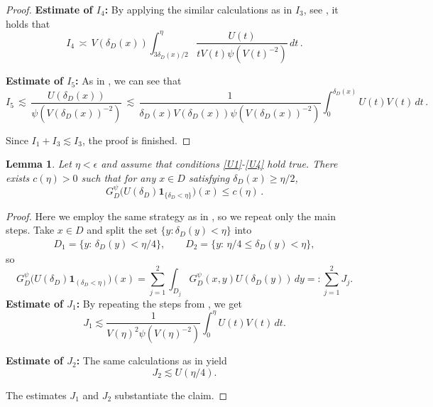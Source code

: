 \documentclass[12pt,a4paper,onecolumn]{article}
\newtheorem{lem}[thm]{Lemma}
\theoremstyle{definition}
\newcommand{\1}{\mathbf 1}
\newcommand{\de}{\delta_D}
\newcommand{\GDP}{G_D^\psi}
\numberwithin{equation}{section}
\begin{document}
\begin{proof}
        \noindent
        {\bf Estimate of $I_4$:} By applying the similar calculations as in $I_3$, see \cite[Estimate of $I_4$ in Lemma A.3]{Bio23cpaa}, it holds that
        \begin{equation*}
        	I_4\,\asymp\, V(\de(x))\int_{3\de(x)/2}^{\eta} \frac{U(t)}{tV(t)\psi(V(t)^{-2})}\, dt\,.
        \end{equation*}
        
        	\noindent
        {\bf Estimate of $I_5$:}  As in \cite[Estimate of $I_5$ in Lemma A.3]{Bio23cpaa}, we can see that
        \begin{equation*}
        	I_5 \,\lesssim\, \frac{U(\de(x))}{\psi(V(\de(x))^{-2})}\,\lesssim\, \frac{1}{\de(x)V(\de(x))\psi(V(\de(x))^{-2})}\int_0^{\de(x)}U(t)V(t)\, dt\, .
        \end{equation*}
        
        Since $I_1 + I_3\lesssim I_3$, the proof is finished.

    \end{proof}
    		

        \begin{lem}\label{apx:l:away-from-bdry}
		Let $\eta<\epsilon$ and assume that  conditions \ref{U1}-\ref{U4} hold true. There exists $c(\eta)>0$ such that for any $x\in D$ satisfying $\de(x)\ge\eta/2$, 
		\begin{equation*}
			\GDP\big(U(\de)\1_{\{\de<\eta\}}\big)(x)\le c(\eta)\, .
		\end{equation*}
	\end{lem}

    \begin{proof}
        Here we employ the same strategy as in \cite[Lemma A.4]{Bio23cpaa}, so we repeat only the main steps. Take $x\in D$ and split the set $\{y:\de(y)< \eta\}$ into 
        \begin{align*}
        	D_1=\{y:\, \de(y)<\eta/4\},\qquad
        	D_2=\{y:\, \eta/4 \le \de(y) <\eta\},
        \end{align*}
        so
        $$
        \GDP\big(U(\delta_D)\1_{(\delta_D<\eta)}\big)(x)=\sum_{j=1}^2 \int_{D_j}\GDP(x,y)U(\delta_D(y))\, dy =:\sum_{j=1}^2 J_j.
        $$
        {\bf Estimate of $J_1$:} 
        By repeating the steps from  \cite[Estimate of $J_1$ in Lemma A.4]{Bio23cpaa}, we get
        \begin{equation*}
        	J_1\lesssim\frac{1}{V(\eta)^2\psi(V(\eta)^{-2})} \int_0^{\eta}U(t)V(t)\, dt.
        \end{equation*}
        
        	\noindent
        {\bf Estimate of $J_2$:}
       	The same calculations as in \cite[Estimate of $J_2$ in Lemma A.4]{Bio23cpaa} yield
        \begin{equation*}
        	J_2\lesssim U(\eta/4).
        \end{equation*}
        
        The estimates $J_1$ and $J_2$ substantiate the claim.       
    \end{proof}
\end{document}
